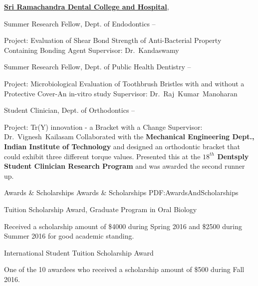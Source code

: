 \documentclass[letterpaper,MMMyyyy,nonstopmode]{simpleresumecv}
\begin{document}
\begin{Body}
\BigGap
\Entry
\href{http://www.sriramachandra.edu.in/university/dci}
{\textbf{Sri Ramachandra Dental College and Hospital}},


\Gap
\BulletItem
Summer Research Fellow, Dept. of Endodontics
\hfill
{} --
\begin{Detail}
\SubBulletItem
Project:
Evaluation of Shear Bond Strength of Anti-Bacterial Property Containing Bonding Agent
\SubBulletItem
Supervisor:
Dr.~Kandaswamy
\end{Detail}

\Gap
\BulletItem
Summer Research Fellow, Dept. of Public Health Dentistry
\hfill
{} --
\begin{Detail}
\SubBulletItem
Project:
Microbiological Evaluation of Toothbrush Bristles with and without a Protective Cover-An in-vitro study
\SubBulletItem
Supervisor:
Dr.~Raj~Kumar~Manoharan
\end{Detail}

\Gap
\BulletItem
Student Clinician, Dept. of Orthodontics
\hfill
{} --
\begin{Detail}
\SubBulletItem
Project:
Tr(Y) innovation - a Bracket with a Change
\SubBulletItem
Supervisor:
Dr.~Vignesh~Kailasam
\SubBulletItem
Collaborated with the \textbf{Mechanical Engineering Dept., Indian Institute of Technology} and designed an orthodontic bracket that could exhibit three different torque values. Presented this at the \textbf{$18^{th}$ Dentsply Student Clinician Research Program} and was awarded the second runner up.
\end{Detail}

\newpage


\Section
{Awards \&\newline
Scholarships}
{Awards \& Scholarships}
{PDF:AwardsAndScholarships}

\BulletItem
Tuition Scholarship Award, Graduate Program in Oral Biology
\hfill
{}
\begin{Detail}
\Item
Received a scholarship amount of \$4000  during Spring 2016 and \$2500  during Summer 2016 for good academic standing.
\end{Detail}

\BulletItem
International Student Tuition Scholarship Award
\hfill
{}
\begin{Detail}
\Item
One of the 10 awardees who received a scholarship amount of \$500  during Fall 2016. 
\end{Detail}


\end{Body}
\end{document}
